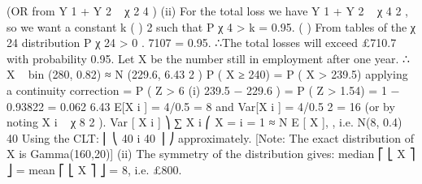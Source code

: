 \documentclass[a4paper,12pt]{article}
\begin{document}
(OR from Y 1 + Y 2 ~ χ 2 4 )
(ii)
For the total loss we have Y 1 + Y 2 ~ χ 4 2 , so we want a constant k
(
)
2
such that P χ 4 > k = 0.95.
(
)
From tables of the χ 24 distribution P χ 24 > 0 . 7107 = 0.95.
∴The total losses will exceed £710.7 with probability 0.95.
Let X be the number still in employment after one year.
∴ X ~ bin (280, 0.82) ≈ N (229.6, 6.43 2 )
P ( X ≥ 240) = P ( X > 239.5) applying a continuity correction
= P ( Z >
6
(i)
239.5 − 229.6
) = P ( Z > 1.54) = 1 − 0.93822 = 0.062
6.43
E[X i ] = 4/0.5 = 8 and Var[X i ] = 4/0.5 2 = 16 (or by noting X i ~ χ 8 2 ).
Var [ X i ] ⎞
∑ X i ⎛
X = i = 1 ≈ N E [ X ],
, i.e. N(8, 0.4)
40
Using the CLT:
⎜
⎝
40
i
40
⎟
⎠
approximately.
[Note: The exact distribution of X is Gamma(160,20)]
(ii)
The symmetry of the distribution gives: median ⎡ ⎣ X ⎤ ⎦ = mean ⎡ ⎣ X ⎤ ⎦ = 8,
i.e. £800.
\end{document}
